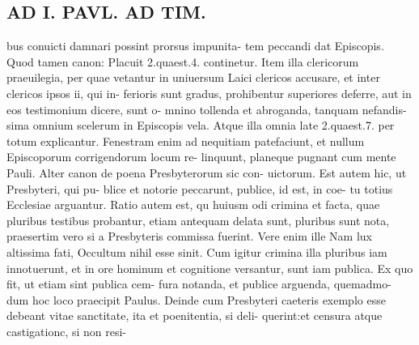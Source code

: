 \documentclass{article}
\begin{document}
\begin{pages}
\section*{AD I. PAVL. AD TIM. }
\marginpar{[ p.310 ]}bus conuicti damnari possint prorsus impunita- tem peccandi dat Episcopis. Quod tamen canon: Placuit 2.quaest.4. continetur. Item illa clericorum praeuilegia, per quae vetantur in uniuersum Laici clericos accusare, et inter clericos ipsos ii, qui in- ferioris sunt gradus, prohibentur superiores deferre, aut in eos testimonium dicere, sunt o- mnino tollenda et abroganda, tanquam nefandis- sima omnium scelerum in Episcopis vela. Atque illa omnia late 2.quaest.7. per totum explicantur. Fenestram enim ad nequitiam patefaciunt, et nullum Episcoporum corrigendorum locum re- linquunt, planeque pugnant cum mente Pauli.   Alter canon de poena Presbyterorum sic con- uictorum. Est autem hic, ut Presbyteri, qui pu- blice et notorie peccarunt, publice, id est, in coe- tu totius Ecclesiae arguantur. Ratio autem est, qu huiusm odi crimina et facta, quae pluribus testibus probantur, etiam antequam delata sunt, pluribus sunt nota, praesertim vero si a Presbyteris commissa fuerint. Vere enim ille Nam lux altissima fati, Occultum nihil esse sinit. Cum igitur crimina illa pluribus iam innotuerunt, et in ore hominum et cognitione versantur, sunt iam publica. Ex quo fit, ut etiam sint publica cem- fura notanda, et publice arguenda, quemadmo- dum hoc loco praecipit Paulus. Deinde cum Presbyteri caeteris exemplo esse debeant vitae sanctitate, ita et poenitentia, si deli- querint:et censura atque castigationc, si non resi- 

\end{pages}
\end{document}
